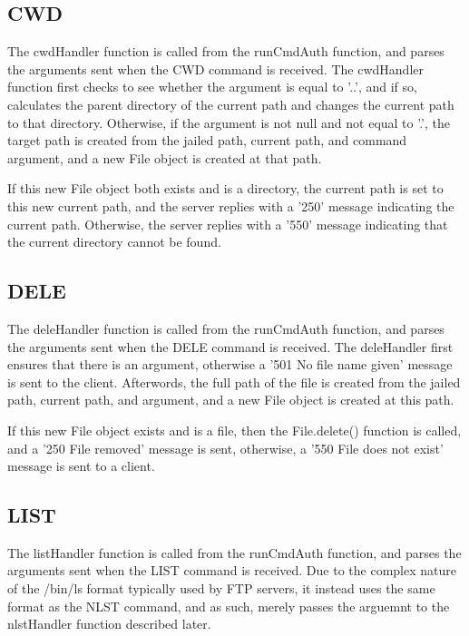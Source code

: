 \documentclass[11pt,a4paper,titlepage]{article}
\begin{document}
\subsection{CWD}
The cwdHandler function is called from the runCmdAuth function, and parses the arguments sent when the CWD command is received. The cwdHandler function first checks to see whether the argument is equal to '..', and if so, calculates the parent directory of the current path and changes the current path to that directory. Otherwise, if the argument is not null and not equal to '.', the target path is created from the jailed path, current path, and command argument, and a new File object is created at that path.

If this new File object both exists and is a directory, the current path is set to this new current path, and the server replies with a '250' message indicating the current path. Otherwise, the server replies with a '550' message indicating that the current directory cannot be found.

\subsection{DELE}
The deleHandler function is called from the runCmdAuth function, and parses the arguments sent when the DELE command is received. The deleHandler first ensures that there is an argument, otherwise a '501 No file name given' message is sent to the client. Afterwords, the full path of the file is created from the jailed path, current path, and argument, and a new File object is created at this path.

If this new File object exists and is a file, then the File.delete() function is called, and a '250 File removed' message is sent, otherwise, a '550 File does not exist' message is sent to a client.

\subsection{LIST}
The listHandler function is called from the runCmdAuth function, and parses the arguments sent when the LIST command is received. Due to the complex nature of the /bin/ls format typically used by FTP servers, it instead uses the same format as the NLST command, and as such, merely passes the arguemnt to the nlstHandler function described later.
\end{document}
